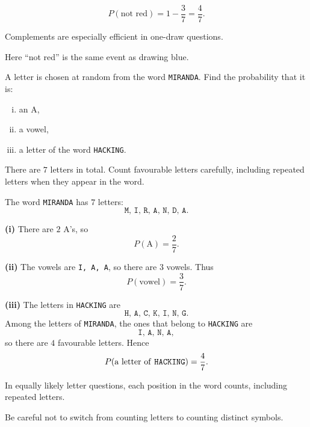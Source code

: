 \begin{solution}
\[
P(\text{not red})=1-\frac37=\frac47.
\]
\end{solution}

\begin{takeaways}
\item Complements are especially efficient in one-draw questions.
\item Here ``not red'' is the same event as drawing blue.
\end{takeaways}

\begin{problem}
A letter is chosen at random from the word \texttt{MIRANDA}. Find the probability that it is:
\begin{enumerate}[(i)]
  \item an A,
  \item a vowel,
  \item a letter of the word \texttt{HACKING}.
\end{enumerate}
\end{problem}

\begin{hint}
There are $7$ letters in total. Count favourable letters carefully, including repeated letters when they appear in the word.
\end{hint}

\begin{solution}
The word \texttt{MIRANDA} has $7$ letters:
\[
\texttt{M, I, R, A, N, D, A}.
\]

\textbf{(i)} There are $2$ A's, so
\[
P(\text{A})=\frac27.
\]

\textbf{(ii)} The vowels are \texttt{I, A, A}, so there are $3$ vowels. Thus
\[
P(\text{vowel})=\frac37.
\]

\textbf{(iii)} The letters in \texttt{HACKING} are
\[
\texttt{H, A, C, K, I, N, G}.
\]
Among the letters of \texttt{MIRANDA}, the ones that belong to \texttt{HACKING} are
\[
\texttt{I, A, N, A},
\]
so there are $4$ favourable letters. Hence
\[
P(\text{a letter of \texttt{HACKING}})=\frac47.
\]
\end{solution}

\begin{takeaways}
\item In equally likely letter questions, each position in the word counts, including repeated letters.
\item Be careful not to switch from counting letters to counting distinct symbols.
\end{takeaways}

